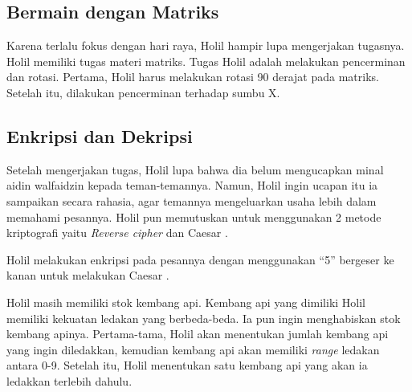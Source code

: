 \documentclass{subfiles}
\begin{document}
\subsection{Bermain dengan Matriks}
Karena terlalu fokus dengan hari raya, Holil hampir lupa mengerjakan tugasnya. Holil memiliki tugas materi matriks. Tugas Holil adalah melakukan pencerminan dan rotasi. Pertama, Holil harus melakukan rotasi 90 derajat pada matriks. Setelah itu, dilakukan pencerminan terhadap sumbu X.



\subsection{Enkripsi dan Dekripsi}

Setelah mengerjakan tugas, Holil lupa bahwa dia belum mengucapkan minal aidin walfaidzin kepada teman-temannya. Namun, Holil ingin ucapan itu ia sampaikan secara rahasia, agar temannya mengeluarkan usaha lebih dalam memahami pesannya. Holil pun memutuskan untuk menggunakan 2 metode kriptografi yaitu \textit{Reverse cipher} dan Caesar {\cipher}.

Holil melakukan enkripsi pada pesannya dengan menggunakan {\key} ``5'' bergeser ke kanan untuk melakukan Caesar {\cipher}.

\newpage
{}

Holil masih memiliki stok kembang api. Kembang api yang dimiliki Holil memiliki kekuatan ledakan yang berbeda-beda. Ia pun ingin menghabiskan stok kembang apinya. Pertama-tama, Holil akan menentukan jumlah kembang api yang ingin diledakkan, kemudian kembang api akan memiliki \textit{range} ledakan antara 0-9. Setelah itu, Holil menentukan satu kembang api yang akan ia ledakkan terlebih dahulu.

\end{document}
